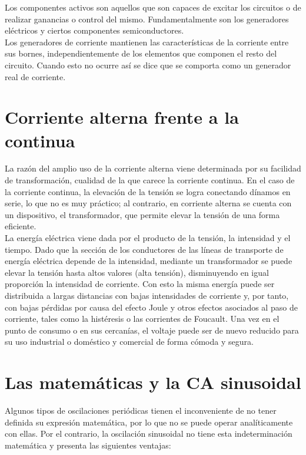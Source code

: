 \documentclass{article}
\begin{document}
  Los componentes activos son aquellos que son capaces de excitar los circuitos o de realizar ganancias o control del mismo. Fundamentalmente son los generadores eléctricos y ciertos componentes semiconductores.\citep{EAP}\\
  
    Los generadores de corriente mantienen las características de la corriente entre sus bornes, independientemente de los elementos que componen el resto del circuito. Cuando esto no ocurre así se dice que se comporta como un generador real de corriente.\citep{EAP}\\


\section{Corriente alterna frente a la continua}

La razón del amplio uso de la corriente alterna viene determinada por su facilidad de transformación, cualidad de la que carece la corriente continua. En el caso de la corriente continua, la elevación de la tensión se logra conectando dínamos en serie, lo que no es muy práctico; al contrario, en corriente alterna se cuenta con un dispositivo, el transformador, que permite elevar la tensión de una forma eficiente.\citep{CA}\\

La energía eléctrica viene dada por el producto de la tensión, la intensidad y el tiempo. Dado que la sección de los conductores de las líneas de transporte de energía eléctrica depende de la intensidad, mediante un transformador se puede elevar la tensión hasta altos valores (alta tensión), disminuyendo en igual proporción la intensidad de corriente. Con esto la misma energía puede ser distribuida a largas distancias con bajas intensidades de corriente y, por tanto, con bajas pérdidas por causa del efecto Joule y otros efectos asociados al paso de corriente, tales como la histéresis o las corrientes de Foucault. Una vez en el punto de consumo o en sus cercanías, el voltaje puede ser de nuevo reducido para su uso industrial o doméstico y comercial de forma cómoda y segura.\citep{CA}\\


\section{Las matemáticas y la CA sinusoidal}

Algunos tipos de oscilaciones periódicas tienen el inconveniente de no tener definida su expresión matemática, por lo que no se puede operar analíticamente con ellas. Por el contrario, la oscilación sinusoidal no tiene esta indeterminación matemática y presenta las siguientes ventajas:\citep{CA}\\
\end{document}
